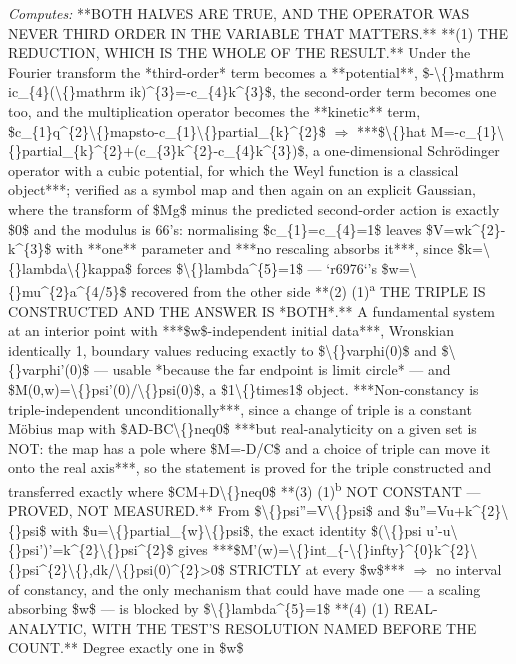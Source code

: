 \begin{description}
\emph{Computes:} **BOTH HALVES ARE TRUE, AND THE OPERATOR WAS NEVER THIRD ORDER IN THE VARIABLE THAT MATTERS.**  **(1) THE REDUCTION, WHICH IS THE WHOLE OF THE RESULT.** Under the Fourier transform the *third-order* term becomes a **potential**, \$-\textbackslash\{\}mathrm ic\_\{4\}(\textbackslash\{\}mathrm ik)\textasciicircum{}\{3\}=-c\_\{4\}k\textasciicircum{}\{3\}\$, the second-order term becomes one too, and the multiplication operator becomes the **kinetic** term, \$c\_\{1\}q\textasciicircum{}\{2\}\textbackslash\{\}mapsto-c\_\{1\}\textbackslash\{\}partial\_\{k\}\textasciicircum{}\{2\}\$ \ensuremath{\Rightarrow} ***\$\textbackslash\{\}hat M=-c\_\{1\}\textbackslash\{\}partial\_\{k\}\textasciicircum{}\{2\}+(c\_\{3\}k\textasciicircum{}\{2\}-c\_\{4\}k\textasciicircum{}\{3\})\$, a one-dimensional Schrödinger operator with a cubic potential, for which the Weyl function is a classical object***; verified as a symbol map and then again on an explicit Gaussian, where the transform of \$Mg\$ minus the predicted second-order action is exactly \$0\$  and the modulus is 66's: normalising \$c\_\{1\}=c\_\{4\}=1\$ leaves \$V=wk\textasciicircum{}\{2\}-k\textasciicircum{}\{3\}\$ with **one** parameter and ***no rescaling absorbs it***, since \$k=\textbackslash\{\}lambda\textbackslash\{\}kappa\$ forces \$\textbackslash\{\}lambda\textasciicircum{}\{5\}=1\$ --- `r6976`'s \$w=\textbackslash\{\}mu\textasciicircum{}\{2\}a\textasciicircum{}\{4/5\}\$ recovered from the other side  **(2) (1)\textsuperscript{a} THE TRIPLE IS CONSTRUCTED AND THE ANSWER IS *BOTH*.** A fundamental system at an interior point with ***\$w\$-independent initial data***, Wronskian identically 1, boundary values reducing exactly to \$\textbackslash\{\}varphi(0)\$ and \$\textbackslash\{\}varphi'(0)\$ --- usable *because the far endpoint is limit circle* --- and \$M(0,w)=\textbackslash\{\}psi'(0)/\textbackslash\{\}psi(0)\$, a \$1\textbackslash\{\}times1\$ object. ***Non-constancy is triple-independent unconditionally***, since a change of triple is a constant Möbius map with \$AD-BC\textbackslash\{\}neq0\$  ***but real-analyticity on a given set is NOT: the map has a pole where \$M=-D/C\$ and a choice of triple can move it onto the real axis***, so the statement is proved for the triple constructed and transferred exactly where \$CM+D\textbackslash\{\}neq0\$  **(3) (1)\textsuperscript{b} NOT CONSTANT --- PROVED, NOT MEASURED.** From \$\textbackslash\{\}psi''=V\textbackslash\{\}psi\$ and \$u''=Vu+k\textasciicircum{}\{2\}\textbackslash\{\}psi\$ with \$u=\textbackslash\{\}partial\_\{w\}\textbackslash\{\}psi\$, the exact identity \$(\textbackslash\{\}psi u'-u\textbackslash\{\}psi')'=k\textasciicircum{}\{2\}\textbackslash\{\}psi\textasciicircum{}\{2\}\$ gives ***\$M'(w)=\textbackslash\{\}int\_\{-\textbackslash\{\}infty\}\textasciicircum{}\{0\}k\textasciicircum{}\{2\}\textbackslash\{\}psi\textasciicircum{}\{2\}\textbackslash\{\},dk/\textbackslash\{\}psi(0)\textasciicircum{}\{2\}>0\$ STRICTLY at every \$w\$*** \ensuremath{\Rightarrow} no interval of constancy, and the only mechanism that could have made one --- a scaling absorbing \$w\$ --- is blocked by \$\textbackslash\{\}lambda\textasciicircum{}\{5\}=1\$  **(4) (1) REAL-ANALYTIC, WITH THE TEST'S RESOLUTION NAMED BEFORE THE COUNT.** Degree exactly one in \$w\$ 
\end{description}
